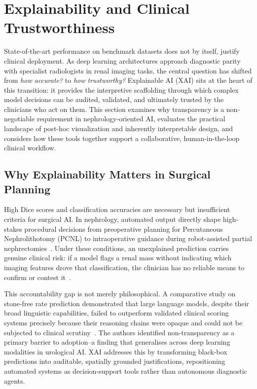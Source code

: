 \documentclass[pdflatex,sn-mathphys-num]{sn-jnl}%
\begin{document}
\section{Explainability and Clinical Trustworthiness}
\label{sec:xai}

State-of-the-art performance on benchmark datasets does not by itself, justify clinical deployment. As deep learning architectures approach diagnostic parity with specialist radiologists in renal imaging tasks, the central question has shifted from \textit{how accurate?} to \textit{how trustworthy?} Explainable AI (XAI) sits at the heart of this transition: it provides the interpretive scaffolding through which complex model decisions can be audited, validated, and ultimately trusted by the clinicians who act on them. This section examines why transparency is a non-negotiable requirement in nephrology-oriented AI, evaluates the practical landscape of post-hoc visualization and inherently interpretable design, and considers how these tools together support a collaborative, human-in-the-loop clinical workflow.

\subsection{Why Explainability Matters in Surgical Planning}
\label{subsec:why_xai}

High Dice scores and classification accuracies are necessary but insufficient criteria for surgical AI. In nephrology, automated output directly shape high-stakes procedural decisions from preoperative planning for Percutaneous Nephrolithotomy (PCNL) to intraoperative guidance during robot-assisted partial nephrectomies~\cite{li2022automatic}. Under these conditions, an unexplained prediction carries genuine clinical risk: if a model flags a renal mass without indicating which imaging features drove that classification, the clinician has no reliable means to confirm or contest it~\cite{kadhim2024machine}.

This accountability gap is not merely philosophical. A comparative study on stone-free rate prediction demonstrated that large language models, despite their broad linguistic capabilities, failed to outperform validated clinical scoring systems precisely because their reasoning chains were opaque and could not be subjected to clinical scrutiny~\cite{elmaagac2026comparison}. The authors identified non-transparency as a primary barrier to adoption--a finding that generalises across deep learning modalities in urological AI. XAI addresses this by transforming black-box predictions into auditable, spatially grounded justifications, repositioning automated systems as decision-support tools rather than autonomous diagnostic agents.
\end{document}

